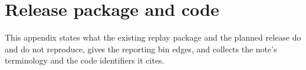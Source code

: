 \section{Release package and code}
\label{app:release-code}

This appendix states what the existing replay package and the planned release do and do not reproduce, gives the reporting bin edges, and collects the note's terminology and the code identifiers it cites.




